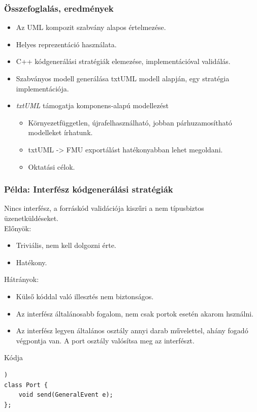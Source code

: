\documentclass[11pt]{beamer}
\begin{document}
\begin{frame}
	\frametitle{Összefoglalás, eredmények}
	\begin{itemize}
	\item Az UML kompozit szabvány alapos értelmezése.
	\item Helyes reprezentáció használata.
	\item C++ kódgenerálási stratégiák elemezése, implementációval validálás.
	\item Szabványos modell generálása txtUML modell alapján, egy stratégia implementációja.
	\item \textit{txtUML} támogatja komponens-alapú modellezést
	\begin{itemize}
	\item Környezetfüggetlen, újrafelhasználható, jobban párhuzamosítható modelleket írhatunk.
	\item {txtUML} -> {FMU} exportálást hatékonyabban lehet megoldani.
	\item Oktatási célok.
	\end{itemize}
	\end{itemize}
\end{frame}

\begin{frame}[fragile]
	\frametitle{Példa: Interfész kódgenerálási stratégiák}
	Nincs interfész, a forráskód validációja kiszűri a nem típusbiztos üzenetküldéseket. \\
	Előnyök:
	\begin{itemize}
		\item Triviális, nem kell dolgozni érte.
		\item Hatékony.
	\end{itemize}
	Hátrányok:
	\begin{itemize}
		\item Külső kóddal való illesztés nem biztonságos.
		\item Az interfész általánosabb fogalom, nem csak portok esetén akarom hsználni.
		\item 	Az interfész legyen általános osztály annyi darab művelettel, ahány fogadó végpontja van. A port osztály valósítsa meg az interfészt.
	\end{itemize}
	
		\begin{block}{Kódja}
	\begin{lstlisting}[basicstyle=\small])
class Port {
	void send(GeneralEvent e);
};
	\end{lstlisting}
	\end{block}
\end{frame}
\end{document}
